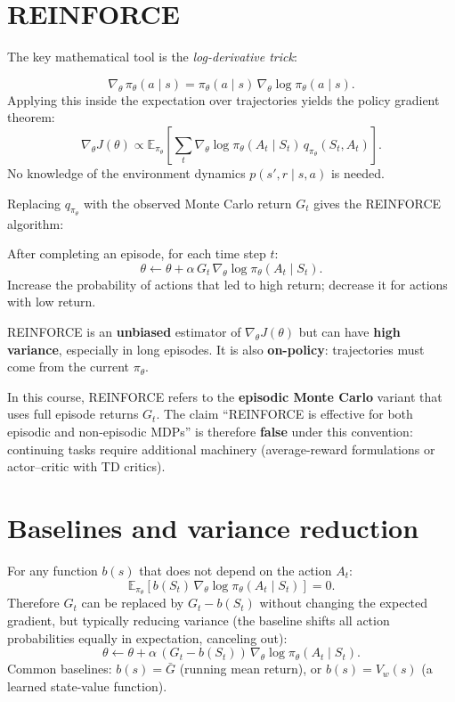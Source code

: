 \documentclass[11pt, oneside]{book}
\newcommand{\E}{\mathbb{E}}
\begin{document}
\section{REINFORCE}

The key mathematical tool is the \emph{log-derivative trick}:

\begin{thmbox}[title={Score Function / Log-Derivative Identity}]
\[
  \nabla_\theta\,\pi_\theta(a\mid s)
  = \pi_\theta(a\mid s)\,\nabla_\theta\log\pi_\theta(a\mid s).
\]
Applying this inside the expectation over trajectories yields the policy
gradient theorem:
\[
  \nabla_\theta J(\theta)
  \propto \E_{\pi_\theta}\!\left[\sum_t
    \nabla_\theta\log\pi_\theta(A_t\mid S_t)\,q_{\pi_\theta}(S_t,A_t)\right].
\]
No knowledge of the environment dynamics $p(s',r\mid s,a)$ is needed.
\end{thmbox}

Replacing $q_{\pi_\theta}$ with the observed Monte Carlo return $G_t$ gives
the REINFORCE algorithm:

\begin{thmbox}[title={REINFORCE (MC Policy Gradient)}]
After completing an episode, for each time step $t$:
\[
  \theta \leftarrow \theta + \alpha\,G_t\,\nabla_\theta\log\pi_\theta(A_t\mid S_t).
\]
Increase the probability of actions that led to high return; decrease it for
actions with low return.
\end{thmbox}

REINFORCE is an \textbf{unbiased} estimator of $\nabla_\theta J(\theta)$ but
can have \textbf{high variance}, especially in long episodes. It is also
\textbf{on-policy}: trajectories must come from the current $\pi_\theta$.

\begin{notebox}[title={Course/Exam Convention}]
In this course, REINFORCE refers to the \textbf{episodic Monte Carlo} variant
that uses full episode returns $G_t$. The claim ``REINFORCE is effective for
both episodic and non-episodic MDPs'' is therefore \textbf{false} under this
convention: continuing tasks require additional machinery (average-reward
formulations or actor--critic with TD critics).
\end{notebox}

\section{Baselines and variance reduction}

\begin{thmbox}[title={Baseline Trick}]
For any function $b(s)$ that does not depend on the action $A_t$:
\[
  \E_{\pi_\theta}\!\left[b(S_t)\,\nabla_\theta\log\pi_\theta(A_t\mid S_t)\right] = 0.
\]
Therefore $G_t$ can be replaced by $G_t - b(S_t)$ without changing the
expected gradient, but typically reducing variance (the baseline shifts all
action probabilities equally in expectation, canceling out):
\[
  \theta \leftarrow \theta
    + \alpha\,(G_t - b(S_t))\,\nabla_\theta\log\pi_\theta(A_t\mid S_t).
\]
Common baselines: $b(s) = \bar{G}$ (running mean return), or
$b(s) = V_w(s)$ (a learned state-value function).
\end{thmbox}
\end{document}
